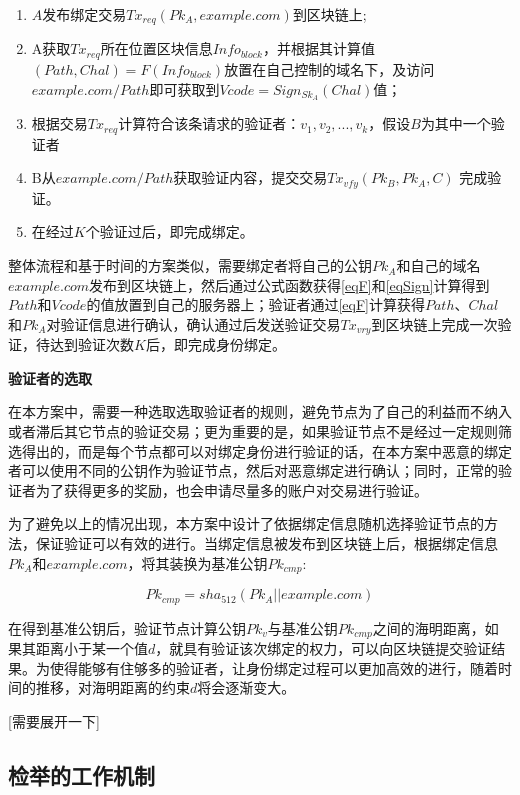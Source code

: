 \begin{enumerate}
	\item $A$发布绑定交易$Tx_{req}(Pk_A, example.com)$到区块链上;
	\item  A获取$Tx_{req}$所在位置区块信息$Info_{block}$，并根据其计算值$(Path, Chal) = F(Info_{block})$放置在自己控制的域名下，及访问$example.com/Path$即可获取到$Vcode = Sign_{Sk_A}(Chal)$值；
	\item 根据交易$Tx_{req}$计算符合该条请求的验证者：${v_1, v_2, ... , v_k}$，假设$B$为其中一个验证者
	\item B从$example.com/Path$获取验证内容，提交交易$Tx_{vfy}(Pk_B, Pk_A, C)$ 完成验证。
	\item 在经过$K$个验证过后，即完成绑定。
\end{enumerate}

整体流程和基于时间的方案类似，需要绑定者将自己的公钥$Pk_A$和自己的域名$example.com$发布到区块链上，然后通过公式函数获得\eqref{eqF}和\eqref{eqSign}计算得到$Path$和$Vcode$的值放置到自己的服务器上；验证者通过\eqref{eqF}计算获得$Path$、$Chal$和$Pk_A$对验证信息进行确认，确认通过后发送验证交易$Tx_{vry}$到区块链上完成一次验证，待达到验证次数$K$后，即完成身份绑定。

\noindent\textbf{验证者的选取}

在本方案中，需要一种选取选取验证者的规则，避免节点为了自己的利益而不纳入或者滞后其它节点的验证交易；更为重要的是，如果验证节点不是经过一定规则筛选得出的，而是每个节点都可以对绑定身份进行验证的话，在本方案中恶意的绑定者可以使用不同的公钥作为验证节点，然后对恶意绑定进行确认；同时，正常的验证者为了获得更多的奖励，也会申请尽量多的账户对交易进行验证。

为了避免以上的情况出现，本方案中设计了依据绑定信息随机选择验证节点的方法，保证验证可以有效的进行。当绑定信息被发布到区块链上后，根据绑定信息$Pk_A$和$example.com$，将其装换为基准公钥$Pk_{cmp}$:

\begin{equation}\label{eqGenCmpPk}
Pk_{cmp} = sha_{512}(Pk_A||example.com)
\end{equation}

在得到基准公钥后，验证节点计算公钥$Pk_v$与基准公钥$Pk_{cmp}$之间的海明距离，如果其距离小于某一个值$d$，就具有验证该次绑定的权力，可以向区块链提交验证结果。为使得能够有住够多的验证者，让身份绑定过程可以更加高效的进行，随着时间的推移，对海明距离的约束$d$将会逐渐变大。



[需要展开一下]


\subsection{检举的工作机制}

